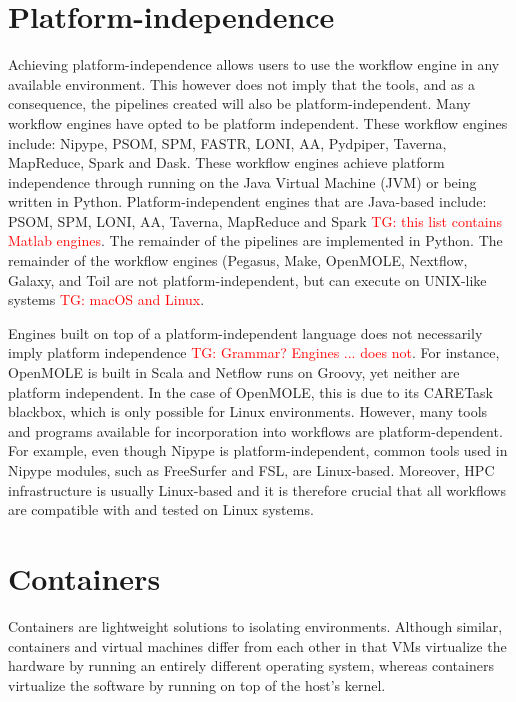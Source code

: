 \documentclass{report}
\newcommand{\tristan}[1]{\textcolor{red}{TG: #1}}
\begin{document}
        \section{Platform-independence}
            Achieving platform-independence allows users to use the workflow 
            engine in any available environment. This however does not imply 
            that the tools, and as a consequence, the pipelines created will
            also be platform-independent. Many workflow engines have opted to 
            be platform independent. These workflow engines include: Nipype,
            PSOM, SPM, FASTR, LONI, AA, Pydpiper, Taverna, MapReduce, Spark and
            Dask. These workflow engines achieve platform independence through
            running on the Java Virtual Machine (JVM) or being written in 
            Python. Platform-independent engines that are Java-based include: 
            PSOM, SPM, LONI, AA, Taverna, MapReduce and Spark \tristan{this list contains Matlab
            engines}. The remainder of
            the pipelines are implemented in Python. The remainder of the 
            workflow engines (Pegasus, Make, OpenMOLE, Nextflow, Galaxy, and 
            Toil are not platform-independent, but can execute on UNIX-like 
            systems \tristan{macOS and Linux}.

            Engines built on top of a platform-independent language does not 
            necessarily imply platform independence \tristan{Grammar? Engines ... does not}. For instance, OpenMOLE is 
            built in Scala and Netflow runs on Groovy, yet neither are platform
            independent. In the case of OpenMOLE, this is due to its CARETask
            blackbox, which is only possible for Linux environments. However,
            many tools and programs available for incorporation into workflows
            are platform-dependent. For example, even though Nipype is 
            platform-independent, common tools used in Nipype modules, such as 
            FreeSurfer and FSL, are Linux-based. Moreover, HPC infrastructure 
            is usually Linux-based and it is therefore crucial that all 
            workflows are compatible with and tested on Linux systems.
             
       \section{Containers}

            Containers are lightweight solutions to isolating 
            environments. Although similar, containers and virtual machines 
            differ from each 
            other in that VMs virtualize the
            hardware by running an entirely different operating system, whereas
            containers virtualize the software by running on top of the host's
            kernel. 
        
\end{document}

